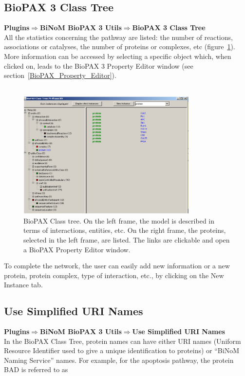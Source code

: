 \subsection{BioPAX 3 Class Tree}
\textbf{Plugins$\Rightarrow$BiNoM BioPAX 3 Utils$\Rightarrow$BioPAX 3 Class
Tree}\\
All the statistics concerning the pathway are listed: the number of reactions,
associations or catalyses, the number of proteins or complexes, etc
(figure~\ref{BioPAX_Class_Tree}). More information can be accessed by selecting
a specific object which, when clicked on, leads to the BioPAX 3 Property Editor
window (see section~\ref{BioPAX_Property_Editor}).\\\\
\begin{figure}[h]
\centering
\includegraphics[width=0.8\textwidth]{graphics/BioPAX_Class_Tree}
\caption{BioPAX Class tree. On the left frame, the model is described in terms
of interactions, entities, etc. On the right frame, the proteins, selected in
the left frame, are listed. The links are clickable and open a BioPAX Property
Editor window.}
\label{BioPAX_Class_Tree}
\end{figure}
To complete the network, the user can easily add new information or a new
protein, protein complex, type of interaction, etc., by clicking on the New
Instance tab.

\subsection{Use Simplified URI Names}
\textbf{Plugins$\Rightarrow$BiNoM BioPAX 3 Utils$\Rightarrow$Use Simplified URI Names}\\

In the BioPAX Class Tree, protein names can have either URI names (Uniform Resource Identifier used to give a unique identification to proteins) or “BiNoM Naming Service” names. For example, for the apoptosis pathway, the protein BAD is referred to as\\

